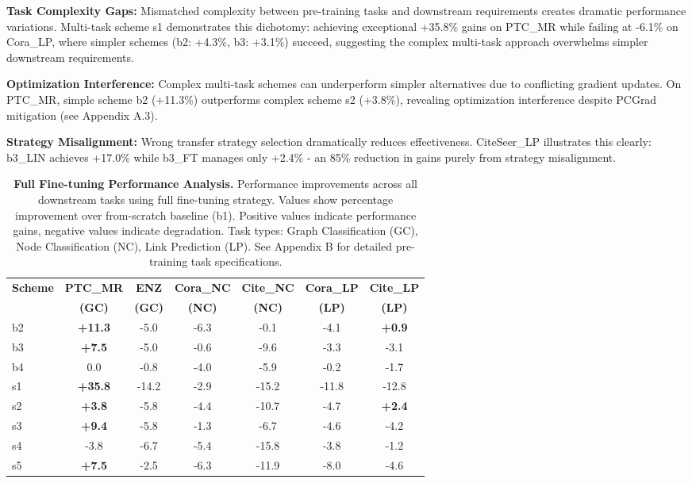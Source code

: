 \documentclass[11pt]{article}
\begin{document}
\textbf{Task Complexity Gaps:} Mismatched complexity between pre-training tasks and downstream requirements creates dramatic performance variations. Multi-task scheme s1 demonstrates this dichotomy: achieving exceptional +35.8\% gains on PTC\_MR while failing at -6.1\% on Cora\_LP, where simpler schemes (b2: +4.3\%, b3: +3.1\%) succeed, suggesting the complex multi-task approach overwhelms simpler downstream requirements.

\textbf{Optimization Interference:} Complex multi-task schemes can underperform simpler alternatives due to conflicting gradient updates. On PTC\_MR, simple scheme b2 (+11.3\%) outperforms complex scheme s2 (+3.8\%), revealing optimization interference despite PCGrad mitigation (see Appendix A.3).

\textbf{Strategy Misalignment:} Wrong transfer strategy selection dramatically reduces effectiveness. CiteSeer\_LP illustrates this clearly: b3\_LIN achieves +17.0\% while b3\_FT manages only +2.4\% - an 85\% reduction in gains purely from strategy misalignment.



\begin{table}[!htb]
\centering
\scriptsize
\setlength{\tabcolsep}{1.5pt}
\renewcommand{\arraystretch}{1.05}
\begin{tabular}{l c c c c c c}
\toprule
\textbf{Scheme} & \textbf{PTC\_MR} & \textbf{ENZ} & \textbf{Cora\_NC} & \textbf{Cite\_NC} & \textbf{Cora\_LP} & \textbf{Cite\_LP} \\
& \textbf{(GC)} & \textbf{(GC)} & \textbf{(NC)} & \textbf{(NC)} & \textbf{(LP)} & \textbf{(LP)} \\
\midrule
b2 & \textbf{+11.3} & -5.0 & -6.3 & -0.1 & -4.1 & \textbf{+0.9} \\
b3 & \textbf{+7.5} & -5.0 & -0.6 & -9.6 & -3.3 & -3.1 \\
b4 & 0.0 & -0.8 & -4.0 & -5.9 & -0.2 & -1.7 \\
s1 & \textbf{+35.8} & -14.2 & -2.9 & -15.2 & -11.8 & -12.8 \\
s2 & \textbf{+3.8} & -5.8 & -4.4 & -10.7 & -4.7 & \textbf{+2.4} \\
s3 & \textbf{+9.4} & -5.8 & -1.3 & -6.7 & -4.6 & -4.2 \\
s4 & -3.8 & -6.7 & -5.4 & -15.8 & -3.8 & -1.2 \\
s5 & \textbf{+7.5} & -2.5 & -6.3 & -11.9 & -8.0 & -4.6 \\
\bottomrule
\end{tabular}
\caption{\textbf{Full Fine-tuning Performance Analysis.} Performance improvements across all downstream tasks using full fine-tuning strategy. Values show percentage improvement over from-scratch baseline (b1). Positive values indicate performance gains, negative values indicate degradation. Task types: Graph Classification (GC), Node Classification (NC), Link Prediction (LP). See Appendix B for detailed pre-training task specifications.}
\label{tab:full-finetune-performance}
\end{table}
\end{document}
